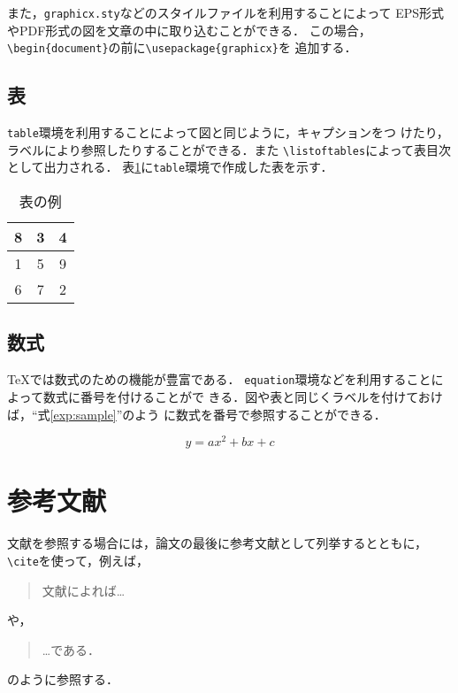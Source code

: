 \documentclass[11pt]{jreport}
\begin{document}
また，{\tt graphicx.sty}などのスタイルファイルを利用することによって
EPS形式やPDF形式の図を文章の中に取り込むことができる．
この場合，\verb|\begin{document}|の前に\verb|\usepackage{graphicx}|を
追加する．

\section{表}

{\tt table}環境を利用することによって図と同じように，キャプションをつ
けたり，ラベルにより参照したりすることができる．また
\verb|\listoftables|によって表目次として出力される．
表\ref{tab:sample}に{\tt table}環境で作成した表を示す．

\begin{table}
  \caption{表の例}
  \label{tab:sample}
  \centering
  \begin{tabular}{|c|c|c|}
    \hline
    8 & 3 & 4\\
    \hline
    1 & 5 & 9 \\
    \hline
    6 & 7 & 2 \\
    \hline
  \end{tabular}
\end{table}

\section{数式}

\TeX では数式のための機能が豊富である．
{\tt equation}環境などを利用することによって数式に番号を付けることがで
きる．図や表と同じくラベルを付けておけば，``式\ref{exp:sample}''のよう
に数式を番号で参照することができる．

\begin{equation}
  y = ax^2 + bx + c \label{exp:sample}
\end{equation}

\chapter{参考文献}

文献を参照する場合には，論文の最後に参考文献として列挙するとともに，
\verb|\cite|を使って，例えば，
\begin{quote}
  文献\cite{latex}によれば…
\end{quote}
や，
\begin{quote}
  …である\cite{latex2e}．
\end{quote}
のように参照する．
\end{document}
